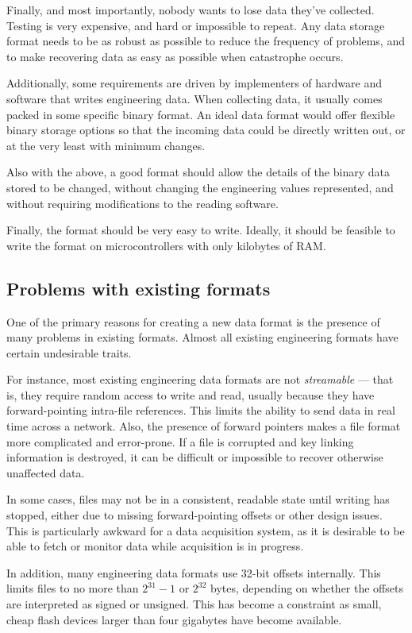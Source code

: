 \documentclass{article}
\begin{document}
Finally, and most importantly, nobody wants to lose data they've
collected.  Testing is very expensive, and hard or impossible to
repeat.  Any data storage format needs to be as robust as possible to
reduce the frequency of problems, and to make recovering data as easy
as possible when catastrophe occurs.

Additionally, some requirements are driven by implementers of hardware
and software that writes engineering data.  When collecting data, it
usually comes packed in some specific binary format.  An ideal data
format would offer flexible binary storage options so that the
incoming data could be directly written out, or at the very least with
minimum changes.

Also with the above, a good format should allow the details of the
binary data stored to be changed, without changing the engineering
values represented, and without requiring modifications to the reading
software.

Finally, the format should be very easy to write.  Ideally, it should
be feasible to write the format on microcontrollers with only
kilobytes of RAM.

\subsection{Problems with existing formats}

One of the primary reasons for creating a new data format is the
presence of many problems in existing formats.  Almost all existing
engineering formats have certain undesirable traits.

For instance, most existing engineering data formats are not
\emph{streamable} --- that is, they require random access to write and
read, usually because they have forward-pointing intra-file
references.  This limits the ability to send data in real time across
a network.  Also, the presence of forward pointers makes a file format
more complicated and error-prone.  If a file is corrupted and key
linking information is destroyed, it can be difficult or impossible to
recover otherwise unaffected data.

In some cases, files may not be in a consistent, readable state
until writing has stopped, either due to missing forward-pointing
offsets or other design issues.  This is particularly awkward for a
data acquisition system, as it is desirable to be able to fetch or
monitor data while acquisition is in progress.

In addition, many engineering data formats use 32-bit offsets
internally.  This limits files to no more than $2^{31}-1$ or $2^{32}$
bytes, depending on whether the offsets are interpreted as signed or
unsigned.  This has become a constraint as small, cheap flash devices
larger than four gigabytes have become available.
\end{document}
